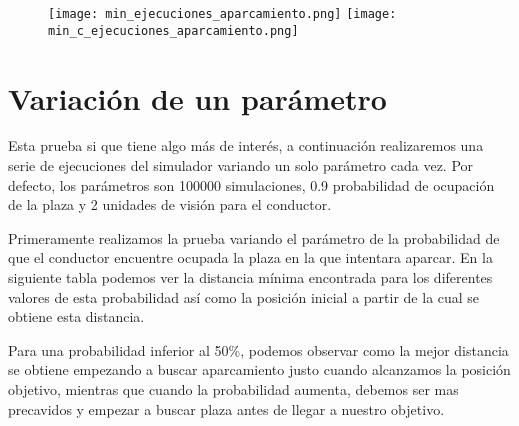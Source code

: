 \newpage

\begin{figure}[h]
\texttt{[image: min\_ejecuciones\_aparcamiento.png]}
\texttt{[image: min\_c\_ejecuciones\_aparcamiento.png]}
\centering
\end{figure}

\newpage


\section{Variación de un parámetro}
Esta prueba si que tiene algo más de interés, a continuación realizaremos una serie de ejecuciones del simulador variando un solo parámetro cada vez. Por defecto, los parámetros son 100000 simulaciones, 0.9 probabilidad de ocupación de la plaza y 2 unidades de visión para el conductor.

Primeramente realizamos la prueba variando el parámetro de la probabilidad de que el conductor encuentre ocupada la plaza en la que intentara aparcar. En la siguiente tabla podemos ver la distancia mínima encontrada para los diferentes valores de esta probabilidad así como la posición inicial a partir de la cual se obtiene esta distancia.

\begin{table}[h]
\centering
{}
\end{table}

Para una probabilidad inferior al 50\%, podemos observar como la mejor distancia se obtiene empezando a buscar aparcamiento justo cuando alcanzamos la posición objetivo, mientras que cuando la probabilidad aumenta, debemos ser mas precavidos y empezar a buscar plaza antes de llegar a nuestro objetivo.

